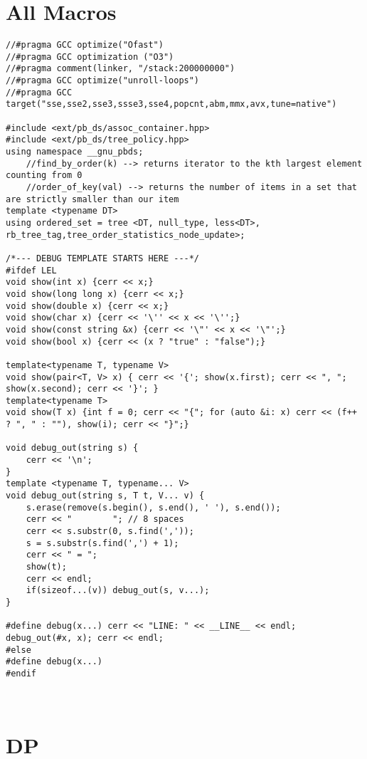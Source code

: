 \documentclass[FSZ,a4paper,onesided]{article}
\begin{document}
\begin{multicols*}{\COLS}
\tableofcontents
\newpage
{}


\section{All Macros}
\begin{lstlisting}
//#pragma GCC optimize("Ofast")
//#pragma GCC optimization ("O3")
//#pragma comment(linker, "/stack:200000000")
//#pragma GCC optimize("unroll-loops")
//#pragma GCC target("sse,sse2,sse3,ssse3,sse4,popcnt,abm,mmx,avx,tune=native")

#include <ext/pb_ds/assoc_container.hpp>
#include <ext/pb_ds/tree_policy.hpp>
using namespace __gnu_pbds;
    //find_by_order(k) --> returns iterator to the kth largest element counting from 0
    //order_of_key(val) --> returns the number of items in a set that are strictly smaller than our item
template <typename DT> 
using ordered_set = tree <DT, null_type, less<DT>, rb_tree_tag,tree_order_statistics_node_update>;

/*--- DEBUG TEMPLATE STARTS HERE ---*/
#ifdef LEL
void show(int x) {cerr << x;}
void show(long long x) {cerr << x;}
void show(double x) {cerr << x;}
void show(char x) {cerr << '\'' << x << '\'';}
void show(const string &x) {cerr << '\"' << x << '\"';}
void show(bool x) {cerr << (x ? "true" : "false");}

template<typename T, typename V>
void show(pair<T, V> x) { cerr << '{'; show(x.first); cerr << ", "; show(x.second); cerr << '}'; }
template<typename T>
void show(T x) {int f = 0; cerr << "{"; for (auto &i: x) cerr << (f++ ? ", " : ""), show(i); cerr << "}";}

void debug_out(string s) {
    cerr << '\n';
}
template <typename T, typename... V>
void debug_out(string s, T t, V... v) {
    s.erase(remove(s.begin(), s.end(), ' '), s.end());
    cerr << "        "; // 8 spaces
    cerr << s.substr(0, s.find(','));
    s = s.substr(s.find(',') + 1);
    cerr << " = ";
    show(t);
    cerr << endl;
    if(sizeof...(v)) debug_out(s, v...);
}

#define debug(x...) cerr << "LINE: " << __LINE__ << endl; debug_out(#x, x); cerr << endl;
#else
#define debug(x...)
#endif



\end{lstlisting}
\section{DP}

\end{multicols*}
\end{document}
